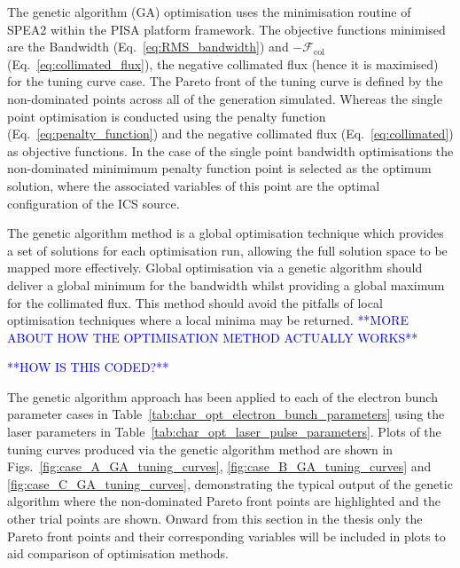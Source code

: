 \documentclass[../main.tex]{subfiles}
\begin{document}
The genetic algorithm (GA) optimisation uses the minimisation routine of \textsc{SPEA2} \cite{zitzler2001spea2} within the \textsc{PISA} platform \cite{bleuler2003pisa} framework. The objective functions minimised are the  Bandwidth (Eq.~\ref{eq:RMS_bandwidth}) and $-\mathcal{F}_{\mathrm{col}}$ (Eq.~\ref{eq:collimated_flux}), the negative collimated flux (hence it is maximised) for the tuning curve case. The Pareto front of the tuning curve is defined by the non-dominated points across all of the generation simulated. Whereas the single point optimisation is conducted using the penalty function (Eq.~\ref{eq:penalty_function}) and the negative collimated flux (Eq.~\ref{eq:collimated}) as objective functions. In the case of the single point bandwidth optimisations the non-dominated minimimum penalty function point is selected as the optimum solution, where the associated variables of this point are the optimal configuration of the ICS source.

The genetic algorithm method is a global optimisation technique which provides a set of solutions for each optimisation run, allowing the full solution space to be mapped more effectively. Global optimisation via a genetic algorithm should deliver a global minimum for the bandwidth whilst providing a global maximum for the collimated flux. This method should avoid the pitfalls of local optimisation techniques where a local minima may be returned. \textcolor{blue}{**MORE ABOUT HOW THE OPTIMISATION METHOD ACTUALLY WORKS**}

\textcolor{blue}{**HOW IS THIS CODED?**}

The genetic algorithm approach has been applied to each of the electron bunch parameter cases in Table~\ref{tab:char_opt_electron_bunch_parameters} using the laser parameters in Table~\ref{tab:char_opt_laser_pulse_parameters}. Plots of the tuning curves produced via the genetic algorithm method are shown in Figs.~\ref{fig:case_A_GA_tuning_curves}, \ref{fig:case_B_GA_tuning_curves} and \ref{fig:case_C_GA_tuning_curves}, demonstrating the typical output of the genetic algorithm where the non-dominated Pareto front points are highlighted and the other trial points are shown. Onward from this section in the thesis only the Pareto front points and their corresponding variables will be included in plots to aid comparison of optimisation methods.
\end{document}
